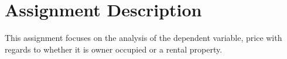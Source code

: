 %
%
%
%
%
%
%
%
\section*{Assignment Description}
% 
This assignment focuses on the analysis of the dependent variable, price with regards to whether it is owner occupied or a rental property.

